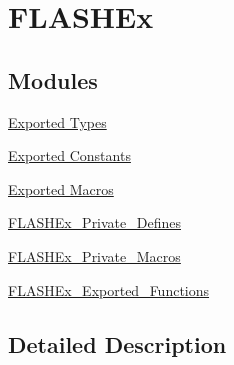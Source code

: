 \hypertarget{group___f_l_a_s_h_ex}{\section{F\-L\-A\-S\-H\-Ex}
\label{group___f_l_a_s_h_ex}
}
\subsection*{Modules}
\begin{DoxyCompactItemize}
\item 
\hyperlink{group___f_l_a_s_h_ex___exported___types}{Exported Types}
\item 
\hyperlink{group___f_l_a_s_h_ex___exported___constants}{Exported Constants}
\item 
\hyperlink{group___f_l_a_s_h_ex___exported___macros}{Exported Macros}
\item 
\hyperlink{group___f_l_a_s_h_ex___private___defines}{F\-L\-A\-S\-H\-Ex\-\_\-\-Private\-\_\-\-Defines}
\item 
\hyperlink{group___f_l_a_s_h_ex___private___macros}{F\-L\-A\-S\-H\-Ex\-\_\-\-Private\-\_\-\-Macros}
\item 
\hyperlink{group___f_l_a_s_h_ex___exported___functions}{F\-L\-A\-S\-H\-Ex\-\_\-\-Exported\-\_\-\-Functions}
\end{DoxyCompactItemize}


\subsection{Detailed Description}
